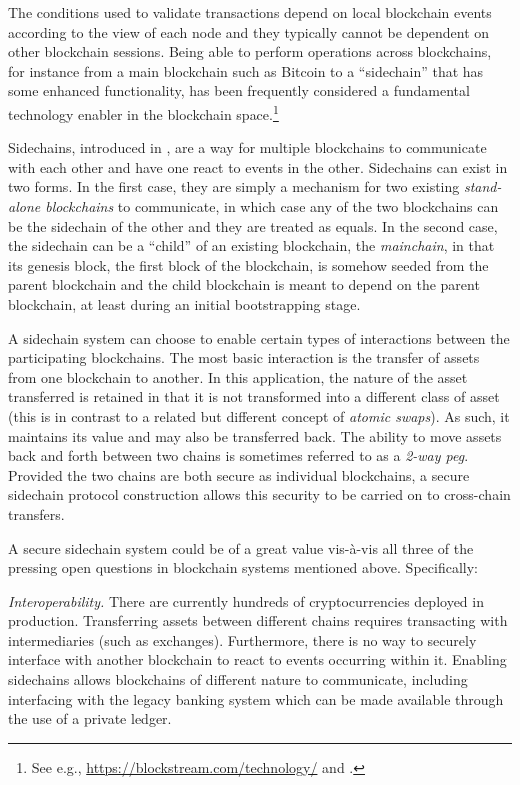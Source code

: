 The conditions used to validate transactions %
depend on local blockchain events according to the view of each node and they
typically cannot be dependent on other blockchain sessions. Being
able to perform operations across blockchains, for instance from a main blockchain
such as Bitcoin to a ``sidechain'' that has some enhanced functionality, has been
frequently considered  a fundamental technology enabler in the blockchain space.\footnote{See
e.g., \url{https://blockstream.com/technology/} and \cite{sidechains}.  }


Sidechains, introduced in \cite{sidechains},  are a
way for multiple blockchains to communicate with each other and have one react
to events in the other. Sidechains can exist in two forms. In the first case, they are simply a mechanism for two
existing \textit{stand-alone blockchains} to communicate, in which case any of
the two blockchains can be the sidechain of the other and they are treated as
equals. In the second case, the
sidechain can be a ``child'' of an existing blockchain, the \textit{mainchain},
in that its genesis block, the first block of the blockchain, is somehow seeded
from the parent blockchain and the child blockchain is meant to depend on the
parent blockchain, at least during an initial bootstrapping stage.

A sidechain system can choose to enable certain types of interactions between
the participating block\-chains. The most basic interaction
is the transfer of assets from
one blockchain to another. In this application, the nature of the asset
transferred is retained in that it is not transformed into a different class of
asset (this is in contrast to a related but different concept of \emph{atomic
swaps}).
As such, it maintains its value and may also be transferred back.
The ability to move assets back and
forth between two chains is sometimes referred to as a \textit{2-way peg}. Provided
the two chains are both secure as individual blockchains, a secure
sidechain protocol construction allows this security to be carried on to
cross-chain transfers.

A secure sidechain system could be of a great value vis-\`a-vis all three
of the pressing open questions in blockchain systems mentioned above. Specifically:

{\em Interoperability.} There are currently hundreds of
    cryptocurrencies deployed in production. Transferring assets between
    different chains requires transacting with intermediaries (such as exchanges). Furthermore,
    there is no way to securely interface with another blockchain to react to
    events occurring within it. Enabling sidechains allows
    blockchains of different nature to communicate, including interfacing with
    the legacy banking system which can be made available through the use of
    a private ledger.

